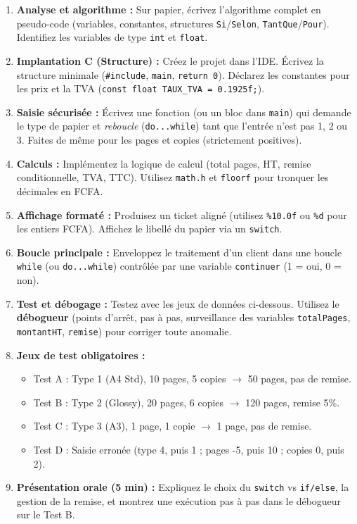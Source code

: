 \documentclass[11pt]{article}
\newcommand{\cle}[1]{{\popxbold\color{popdark}#1}}
\begin{document}
\begin{enumerate}
    \item \textbf{Analyse et algorithme :} Sur papier, écrivez l'algorithme complet en pseudo-code (variables, constantes, structures \texttt{Si}/\texttt{Selon}, \texttt{TantQue}/\texttt{Pour}). Identifiez les variables de type \texttt{int} et \texttt{float}.
    \item \textbf{Implantation C (Structure) :} Créez le projet dans l'IDE. Écrivez la structure minimale (\texttt{\#include}, \texttt{main}, \texttt{return 0}). Déclarez les \cle{constantes} pour les prix et la TVA (\texttt{const float TAUX\_TVA = 0.1925f;}).
    \item \textbf{Saisie sécurisée :} Écrivez une fonction (ou un bloc dans \texttt{main}) qui demande le type de papier et \emph{reboucle} (\texttt{do...while}) tant que l'entrée n'est pas 1, 2 ou 3. Faites de même pour les pages et copies (strictement positives).
    \item \textbf{Calculs :} Implémentez la logique de calcul (total pages, HT, remise conditionnelle, TVA, TTC). Utilisez \texttt{math.h} et \texttt{floorf} pour tronquer les décimales en FCFA.
    \item \textbf{Affichage formaté :} Produisez un ticket aligné (utilisez \texttt{\%10.0f} ou \texttt{\%d} pour les entiers FCFA). Affichez le libellé du papier via un \texttt{switch}.
    \item \textbf{Boucle principale :} Enveloppez le traitement d'un client dans une boucle \texttt{while} (ou \texttt{do...while}) contrôlée par une variable \texttt{continuer} (1 = oui, 0 = non).
    \item \textbf{Test et débogage :} Testez avec les jeux de données ci-dessous. Utilisez le \textbf{débogueur} (points d'arrêt, pas à pas, surveillance des variables \texttt{totalPages}, \texttt{montantHT}, \texttt{remise}) pour corriger toute anomalie.
    \item \textbf{Jeux de test obligatoires :}
    \begin{itemize}
        \item Test A : Type 1 (A4 Std), 10 pages, 5 copies $\rightarrow$ 50 pages, pas de remise.
        \item Test B : Type 2 (Glossy), 20 pages, 6 copies $\rightarrow$ 120 pages, remise 5\%.
        \item Test C : Type 3 (A3), 1 page, 1 copie $\rightarrow$ 1 page, pas de remise.
        \item Test D : Saisie erronée (type 4, puis 1 ; pages -5, puis 10 ; copies 0, puis 2).
    \end{itemize}
    \item \textbf{Présentation orale (5 min) :} Expliquez le choix du \texttt{switch} vs \texttt{if/else}, la gestion de la remise, et montrez une exécution pas à pas dans le débogueur sur le Test B.
\end{enumerate}
\end{document}
